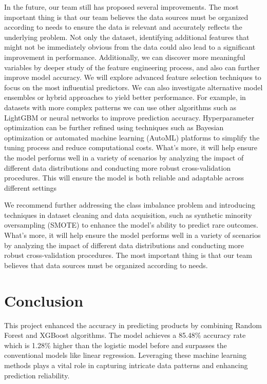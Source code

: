 \documentclass[conference]{IEEEtran}
\begin{document}
In the future, our team still has proposed several improvements. The most important thing is that our team believes the data sources must be organized according to needs to ensure the data is relevant and accurately reflects the underlying problem. Not only the dataset, identifying additional features that might not be immediately obvious from the data could also lead to a significant improvement in performance. Additionally, we can discover more meaningful variables by deeper study of the feature engineering process, and also can further improve model accuracy. We will explore advanced feature selection techniques to focus on the most influential predictors. We can also investigate alternative model ensembles or hybrid approaches to yield better performance. For example, in datasets with more complex patterns we can use other algorithms such as LightGBM or neural networks to improve prediction accuracy. Hyperparameter optimization can be further refined using techniques such as Bayesian optimization or automated machine learning (AutoML) platforms to simplify the tuning process and reduce computational costs. What's more, it will help ensure the model performs well in a variety of scenarios by analyzing the impact of different data distributions and conducting more robust cross-validation procedures. This will ensure the model is both reliable and adaptable across different settings

We recommend further addressing the class imbalance problem and introducing techniques in dataset cleaning and data acquisition, such as synthetic minority oversampling (SMOTE) to enhance the model's ability to predict rare outcomes. What's more, it will help ensure the model performs well in a variety of scenarios by analyzing the impact of different data distributions and conducting more robust cross-validation procedures. The most important thing is that our team believes that data sources must be organized according to needs.

\section{Conclusion}
This project enhanced the accuracy in predicting products by combining Random Forest and XGBoost algorithms. The model achieves a 85.48\% accuracy rate which is 1.28\% higher than the logistic model before and surpasses the conventional models like linear regression. Leveraging these machine learning methods plays a vital role in capturing intricate data patterns and enhancing prediction reliability.
\end{document}
